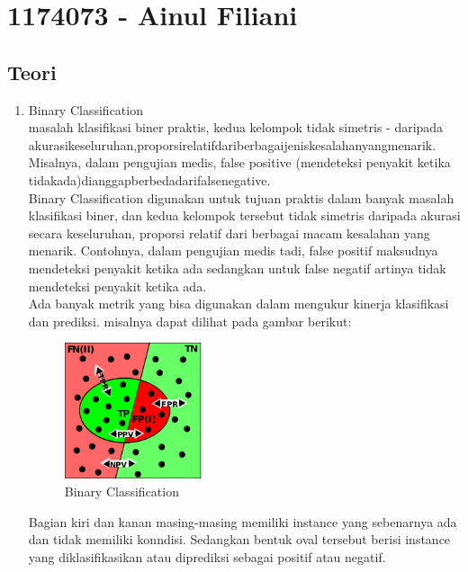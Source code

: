 \section{1174073 - Ainul Filiani}

\subsection{Teori}
\begin{enumerate}
\item Binary Classification \\
masalah klasiﬁkasi biner praktis, kedua kelompok tidak simetris - daripada akurasikeseluruhan,proporsirelatifdariberbagaijeniskesalahanyangmenarik. Misalnya, dalam pengujian medis, false positive (mendeteksi penyakit ketika tidakada)dianggapberbedadarifalsenegative.\\

Binary Classification digunakan untuk tujuan praktis dalam banyak masalah klasifikasi biner, dan kedua kelompok tersebut tidak simetris daripada akurasi secara keseluruhan, proporsi relatif dari berbagai macam kesalahan yang menarik. Contohnya, dalam pengujian medis tadi, false positif maksudnya mendeteksi penyakit ketika ada sedangkan untuk false negatif artinya tidak mendeteksi penyakit ketika ada.\\

Ada banyak metrik yang bisa digunakan dalam mengukur kinerja klasifikasi dan prediksi. misalnya dapat dilihat pada gambar berikut:
\begin{figure}[H]
		\includegraphics[width=4cm]{figures/1174073/2/binary.png}
		\centering
		\caption{Binary Classification}
\end{figure}

Bagian kiri dan kanan masing-masing memiliki instance yang sebenarnya ada dan tidak memiliki konndisi. Sedangkan bentuk oval tersebut berisi instance yang diklasifikasikan atau diprediksi sebagai positif atau negatif.


\end{enumerate}

